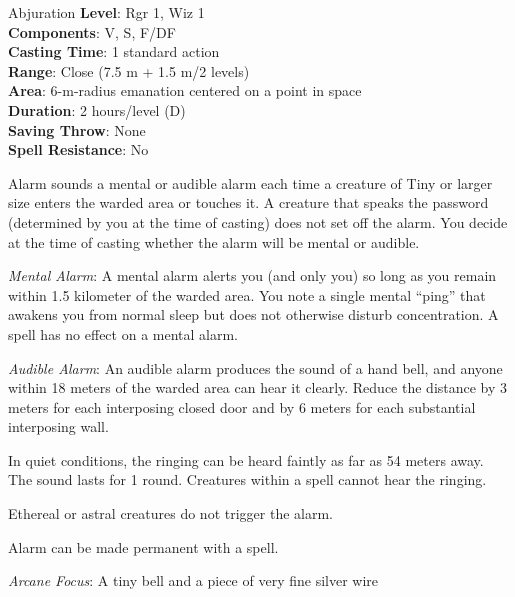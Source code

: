 {Abjuration}
{
	\textbf{Level}: Rgr 1, Wiz 1\\
	\textbf{Components}: V, S, F/DF\\
	\textbf{Casting Time}: 1 standard action\\
	\textbf{Range}: Close (7.5 m + 1.5 m/2 levels)\\
	\textbf{Area}: 6-m-radius emanation centered on a point in space\\
	\textbf{Duration}: 2 hours/level (D)\\
	\textbf{Saving Throw}: None\\
	\textbf{Spell Resistance}: No\\
}
{
	Alarm sounds a mental or audible alarm each time a creature of Tiny or larger size enters the warded area or touches it. A creature that speaks the password (determined by you at the time of casting) does not set off the alarm. You decide at the time of casting whether the alarm will be mental or audible.

	\textit{Mental Alarm}: A mental alarm alerts you (and only you) so long as you remain within 1.5 kilometer of the warded area. You note a single mental ``ping'' that awakens you from normal sleep but does not otherwise disturb concentration. A  spell has no effect on a mental alarm.

	\textit{Audible Alarm}: An audible alarm produces the sound of a hand bell, and anyone within 18 meters of the warded area can hear it clearly. Reduce the distance by 3 meters for each interposing closed door and by 6 meters for each substantial interposing wall.

	In quiet conditions, the ringing can be heard faintly as far as 54 meters away. The sound lasts for 1 round. Creatures within a  spell cannot hear the ringing.

	Ethereal or astral creatures do not trigger the alarm.

	Alarm can be made permanent with a  spell.

	\textit{Arcane Focus}: A tiny bell and a piece of very fine silver wire
}